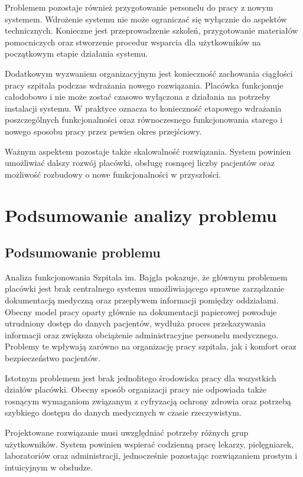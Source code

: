 Problemem pozostaje również przygotowanie personelu do pracy z nowym systemem. Wdrożenie systemu nie może ograniczać się wyłącznie do aspektów technicznych. Konieczne jest przeprowadzenie szkoleń, przygotowanie materiałów pomocniczych oraz stworzenie procedur wsparcia dla użytkowników na początkowym etapie działania systemu.

Dodatkowym wyzwaniem organizacyjnym jest konieczność zachowania ciągłości pracy szpitala podczas wdrażania nowego rozwiązania. Placówka funkcjonuje całodobowo i nie może zostać czasowo wyłączona z działania na potrzeby instalacji systemu. W praktyce oznacza to konieczność etapowego wdrażania poszczególnych funkcjonalności oraz równoczesnego funkcjonowania starego i nowego sposobu pracy przez pewien okres przejściowy.

Ważnym aspektem pozostaje także skalowalność rozwiązania. System powinien umożliwiać dalszy rozwój placówki, obsługę rosnącej liczby pacjentów oraz możliwość rozbudowy o nowe funkcjonalności w przyszłości.
\section{Podsumowanie analizy problemu}
\subsection{Podsumowanie problemu}
Analiza funkcjonowania Szpitala im. Bajgla pokazuje, że głównym problemem placówki jest brak centralnego systemu umożliwiającego sprawne zarządzanie dokumentacją medyczną oraz przepływem informacji pomiędzy oddziałami. Obecny model pracy oparty głównie na dokumentacji papierowej powoduje utrudniony dostęp do danych pacjentów, wydłuża proces przekazywania informacji oraz zwiększa obciążenie administracyjne personelu medycznego. Problemy te wpływają zarówno na organizację pracy szpitala, jak i komfort oraz bezpieczeństwo pacjentów.

Istotnym problemem jest brak jednolitego środowiska pracy dla wszystkich działów placówki. Obecny sposób organizacji pracy nie odpowiada także rosnącym wymaganiom związanym z cyfryzacją ochrony zdrowia oraz potrzebą szybkiego dostępu do danych medycznych w czasie rzeczywistym.

Projektowane rozwiązanie musi uwzględniać potrzeby różnych grup użytkowników. System powinien wspierać codzienną pracę lekarzy, pielęgniarek, laboratoriów oraz administracji, jednocześnie pozostając rozwiązaniem prostym i intuicyjnym w obsłudze. 

